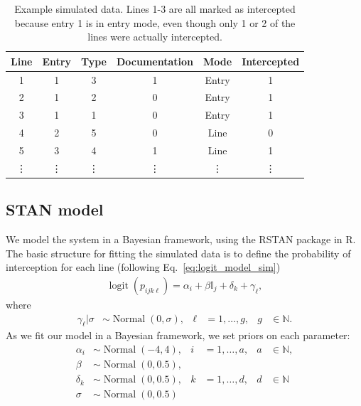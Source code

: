 \documentclass{article}
\DeclareMathOperator{\logit}{logit}
\DeclareMathOperator{\Normal}{Normal}
\begin{document}
\vspace{0.1cm}
\begin{table}[h]
\caption{Example simulated data. Lines 1-3 are all marked as intercepted because entry 1 is in entry mode, even though only 1 or 2 of the lines were actually intercepted.}
\label{table:example_data}
\begin{center}

\begin{tabular}{|c|c|c|c|c|c|}
\hline 
Line & Entry & Type & Documentation & Mode & Intercepted \\ 
\hline 
1 & 1 & 3 & 1  & Entry & 1 \\ 
\hline 
2 & 1 & 2 & 0  & Entry & 1 \\ 
\hline 
3 & 1 & 1 & 0 & Entry & 1 \\ 
\hline 
4 & 2 & 5 & 0 &Line & 0 \\ 
\hline 
5 & 3 & 4 & 1 &Line & 1 \\ 
\hline 
\vdots & \vdots & \vdots & \vdots & \vdots & \vdots \\ 
\hline 
\end{tabular} 

\end{center}
\end{table}

\subsection{STAN model}
We model the system in a Bayesian framework, using the RSTAN package in R. The basic structure for fitting the simulated data is to define the probability of interception for each line (following Eq.~\eqref{eq:logit_model_sim})
\begin{align}
\logit(p_{ijk\ell}) = \alpha_{i} + \beta\mathbb{I}_j + \delta_k + \gamma_\ell, \label{eq:logit_model_fit_sim}
\end{align}
where 
\begin{align}
\gamma_\ell | \sigma &\sim \Normal(0, \sigma), & \ell &= 1,\ldots, g, & g&\in \mathbb{N}.
\end{align}
As we fit our model in a Bayesian framework, we set priors on each parameter:
\begin{align}
\alpha_i &\sim \Normal(-4, 4), & i&=1, \ldots, a, & a&\in \mathbb{N},\\
\beta &\sim \Normal(0, 0.5),\\
\delta_k &\sim \Normal(0, 0.5), & k &= 1,\ldots, d, & d &\in \mathbb{N}\\
\sigma &\sim \Normal(0, 0.5)
\end{align}
\end{document}
